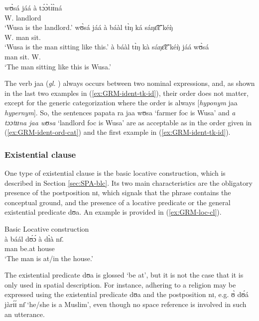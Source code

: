 \ea
\gll
wʊ̀sá jáá à tɔ́ɔ̀tɪ̀ɪ̀ná\\
W. {\ident} {\art} landlord\\
\glt `Wusa is the landlord.'
\ex
\gll
wʊ̀sá jáá  à báàl tɪ̀ŋ ká sáŋɛ̃̄ɛ̃̄ kéŋ̀\\
W. {\ident} {\art} man {\art} {\egr} sit.{\pfv} {\advm}\\
\glt `Wusa is the man sitting like this.'
\ex
\gll
à báàl tɪ̀ŋ kà sáŋɛ̃̄ɛ̃̄ kéŋ̀  jáá wʊ̀sá\\
 {\art} man {\art} {\egr} sit.{\pfv} {\advm} {\ident}   W.\\
\glt `The man sitting like this is Wusa.'



\z 
\z
 \z

The verb {\sls jaa}  ({\it gl.} {\ident}) always  occurs between two nominal  
expressions,  and, as shown in the last two examples in 
(\ref{ex:GRM-ident-tk-id}),  their order  does not matter, except for the 
generic categorization where the order is always [{\it hyponym} {\sls jaa} {\it 
hypernym}].  So,  the sentences {\sls papata ra jaa  wʊsa} `farmer {\sc foc} 
is Wusa' and 
{\it 
a 
tɔɔtɪɪna  jaa  wʊsa} `landlord {\sc foc} is Wusa'   are  as acceptable as in 
the 
order given in (\ref{ex:GRM-ident-ord-cat}) and the first example in 
(\ref{ex:GRM-ident-tk-id}). 



\subsubsection{Existential clause} 
\label{sec:GRM-loc-cl}

One type of existential clause is the basic  locative construction, which is
described in Section \ref{sec:SPA-blc}. Its
two main characteristics are the obligatory presence of the postposition {\sls 
nɪ},  which signals that the phrase contains the conceptual ground, and the
presence of a locative predicate or the general existential predicate {\sls 
dʊa}. An example is provided in (\ref{ex:GRM-loc-cl}).

\ea\label{ex:GRM-loc-cl}{\rm Basic Locative construction}\\
\gll à báál dʊ́ɔ́ à dɪ̀à nɪ̄.\\
{\art}  man be.at {\art} house {\postp}\\
 \glt  `The man is at/in the house.'
\z

The existential predicate {\sls dʊa} is glossed `be at', but it is not the case
that it is only used in spatial description. For instance,  adhering to a
religion may be expressed using the existential predicate {\sls dʊa} and the
postposition {\sls nɪ}, e.g.  {\sls ʊ̀ dʊ́á jàrɪ́ɪ́ nɪ̄} `he/she is a 
Muslim', 
even
though no space reference is involved in such an utterance. 

